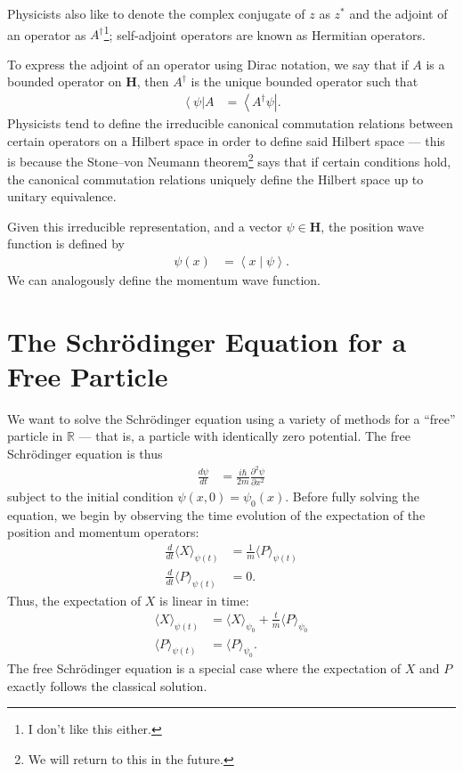 \documentclass[12pt]{extarticle}
\newcommand{\R}{\mathbb{R}}
\newcommand{\bra}[1]{\left\langle#1\right\vert}
\newcommand{\braket}[2]{\left\langle#1\mid#2\right\rangle}
\theoremstyle{plain}
\theoremstyle{definition}
\theoremstyle{remark}
\renewcommand{\newline}{\hfill\break}
\begin{document}
  Physicists also like to denote the complex conjugate of $z$ as $z^{\ast}$ and the adjoint of an operator as $A^{\dagger}$\footnote{I don't like this either.}; self-adjoint operators are known as Hermitian operators.\newline

  To express the adjoint of an operator using Dirac notation, we say that if $A$ is a bounded operator on $\mathbf{H}$, then $A^{\dagger}$ is the unique bounded operator such that
  \begin{align*}
    \bra{\psi}A &= \bra{A^{\dagger}\psi}.
  \end{align*}
  Physicists tend to define the irreducible canonical commutation relations between certain operators on a Hilbert space in order to define said Hilbert space --- this is because the Stone--von Neumann theorem\footnote{We will return to this in the future.} says that if certain conditions hold, the canonical commutation relations uniquely define the Hilbert space up to unitary equivalence.\newline

  Given this irreducible representation, and a vector $\psi \in \mathbf{H}$, the position wave function is defined by
  \begin{align*}
    \psi(x) &= \braket{x}{\psi}.
  \end{align*}
  We can analogously define the momentum wave function.
  \section{The Schrödinger Equation for a Free Particle}%
  We want to solve the Schrödinger equation using a variety of methods for a ``free'' particle in $\R$ --- that is, a particle with identically zero potential. The free Schrödinger equation is thus
  \begin{align*}
    \frac{d\psi}{dt} &= \frac{i\hbar}{2m}\frac{\partial^2\psi}{\partial x^2}
  \end{align*}
  subject to the initial condition $\psi(x,0) = \psi_0(x)$. Before fully solving the equation, we begin by observing the time evolution of the expectation of the position and momentum operators:
  \begin{align*}
    \frac{d}{dt}\langle X \rangle_{\psi(t)} &= \frac{1}{m}\langle P \rangle_{\psi(t)}\\
    \frac{d}{dt}\langle P \rangle_{\psi(t)} &= 0.
  \end{align*}
  Thus, the expectation of $X$ is linear in time:
  \begin{align*}
    \langle X \rangle_{\psi(t)} &= \langle X \rangle_{\psi_0} + \frac{t}{m}\langle P \rangle_{\psi_0}\\
    \langle P \rangle_{\psi(t)} &= \langle P \rangle_{\psi_0}.
  \end{align*}
  The free Schrödinger equation is a special case where the expectation of $X$ and $P$ exactly follows the classical solution.
\end{document}
